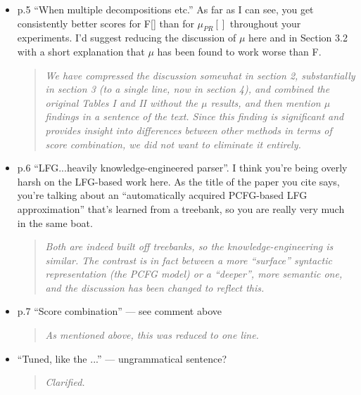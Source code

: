 \documentclass[letterpaper,12pt]{article}
\newenvironment{response}
{\begin{quotation} \it}
  {\end{quotation}}
\begin{document}
\begin{itemize}
\item p.5 ``When multiple decompositions etc.'' As far as I can see, you
  get consistently better scores for F[] than for $\mu_{PR}[]$
  throughout your experiments.  I'd suggest reducing the discussion of
  $\mu$ here and in Section 3.2 with a short explanation that $\mu$
  has been found to work worse than F.
  \begin{response}
  We have compressed the discussion somewhat in section 2,
  substantially in section 3 (to a single line, now in section 4), and combined the original Tables I and II without the $\mu$ results, and then mention $\mu$ findings in a sentence of the text. Since
this finding is significant and provides insight into differences between other methods in terms of score combination, we did not want to eliminate it entirely.
  \end{response}

\item  p.6 ``LFG...heavily knowledge-engineered parser''. I think you're
  being overly harsh on the LFG-based work here. As the title of the
  paper you cite says, you're talking about an ``automatically acquired
  PCFG-based LFG approximation'' that's learned from a treebank, so you
  are really very much in the same boat.
  \begin{response}
    Both are indeed built off treebanks, so the knowledge-engineering
    is similar. The contrast is in fact between a more ``surface''
    syntactic representation (the PCFG model) or a ``deeper'', more
    semantic one, and the discussion has been changed to reflect this.
  \end{response}

\item p.7 ``Score combination'' --- see comment above 
  \begin{response}
    As mentioned above, this was reduced to one line.
  \end{response}

\item ``Tuned, like the ...''  --- ungrammatical sentence?
  \begin{response}
    Clarified.
  \end{response}


\end{itemize}
\end{document}
